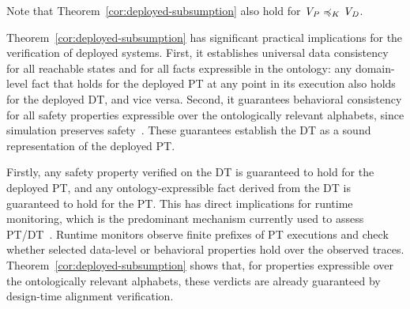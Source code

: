 Note that Theorem~\ref{cor:deployed-subsumption} also hold for $\mathit{V_P} \preccurlyeq_{K} \mathit{V_D}$. 

Theorem~\ref{cor:deployed-subsumption} has significant practical implications for the verification of deployed systems. First, it establishes universal data consistency for all reachable states and for all facts expressible in the ontology: any domain-level fact that holds for the deployed PT at any point in its execution also holds for the deployed DT, and vice versa. Second, it guarantees behavioral consistency for all safety properties expressible over the ontologically relevant alphabets, since simulation preserves safety~\cite{Baier08}. These guarantees establish the DT as a sound representation of the deployed PT.


 Firstly, any safety property verified on the DT is guaranteed to hold for the deployed PT, and any ontology-expressible fact derived from the DT is guaranteed to hold for the PT. This has direct implications for runtime monitoring, which is the predominant mechanism currently used to assess PT/DT~\cite{10.1145/3652620.3688267, moon2023consistency, kamburjan2022twinningbyconstruction, Gil2025}. Runtime monitors observe finite prefixes of PT executions and check whether selected data-level or behavioral properties hold over the observed traces. Theorem~\ref{cor:deployed-subsumption} shows that, for properties expressible over the ontologically relevant alphabets, these verdicts are already guaranteed by design-time alignment verification.



